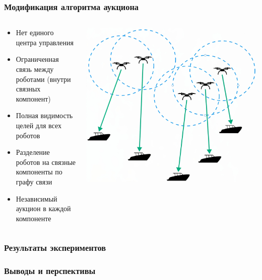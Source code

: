 \documentclass{beamer}
\begin{document}
	\begin{frame}
		\frametitle{Модификация алгоритма аукциона}
		\begin{columns}[T] %
			\begin{column}{0.6\textwidth} %
				\begin{itemize}
					\item Нет единого центра управления
					\item Ограниченная связь между роботами (внутри связных компонент)
					\item Полная видимость целей для всех роботов
					\item Разделение роботов на связные компоненты по графу связи
					\item Независимый аукцион в каждой компоненте
				\end{itemize}
			\end{column}
			\begin{column}{0.4\textwidth} %
				\centering
				\includegraphics[width=\textwidth,height=0.85\textheight,keepaspectratio]{mrta4.jpeg}
			\end{column}
		\end{columns}
	\end{frame}
	
	\begin{frame}
		\frametitle{Результаты экспериментов}
	\end{frame}
	
	\begin{frame}
		\frametitle{Выводы и перспективы}
	\end{frame}
	
\end{document}
